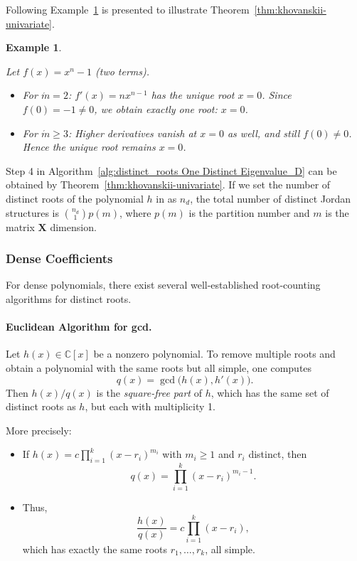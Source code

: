 \documentclass[11pt]{article}
\newtheorem{example}{Example}
\begin{document}
Following Example~\ref{exp:thm:khovanskii-univariate} is presented to illustrate Theorem~\ref{thm:khovanskii-univariate}.
%
\begin{example}\label{exp:thm:khovanskii-univariate}

Let \( f(x) = x^n - 1 \) (two terms).  
\begin{itemize}
  \item For \( \acute{m}=2 \):  
  \( f'(x) = n x^{n-1} \) has the unique root \( x=0 \).  
  Since \( f(0) = -1 \neq 0 \), we obtain exactly one root: \( x=0 \).  

  \item For \( \acute{m} \geq 3 \):  
  Higher derivatives vanish at \( x=0 \) as well, and still \( f(0)\neq 0 \).  
  Hence the unique root remains \( x=0 \).
\end{itemize}

\end{example}

Step 4 in Algorithm~\ref{alg:distinct_roots One Distinct Eigenvalue_D} can be obtained by Theorem~\ref{thm:khovanskii-univariate}. If we set the number of distinct roots of the polynomial $h$ in as $n_d$, the total number of distinct Jordan structures is ${n_d \choose 1}p(m)$, where $p(m)$ is the partition number and $m$ is the matrix $\bm{X}$ dimension.


\subsubsection{Dense Coefficients}

For dense polynomials, there exist several well-established root-counting algorithms for distinct roots.

\paragraph{Euclidean Algorithm for gcd.} 
%
Let \( h(x) \in \mathbb{C}[x] \) be a nonzero polynomial. To remove multiple roots and obtain a polynomial with the same roots but all simple, one computes
\[
q(x) = \gcd\big(h(x), h'(x)\big).
\]
Then \( h(x)/q(x) \) is the \emph{square-free part} of \( h \), which has the same set of distinct roots as \( h \), but each with multiplicity 1.

More precisely:
\begin{itemize}
    \item If \( h(x) = c \prod_{i=1}^k (x - r_i)^{m_i} \) with \( m_i \geq 1 \) and \( r_i \) distinct, then
    \[
    q(x) = \prod_{i=1}^k (x - r_i)^{m_i - 1}.
    \]
    \item Thus,
    \[
    \frac{h(x)}{q(x)} = c \prod_{i=1}^k (x - r_i),
    \]
    which has exactly the same roots \( r_1, \dots, r_k \), all simple.
\end{itemize}
\end{document}
